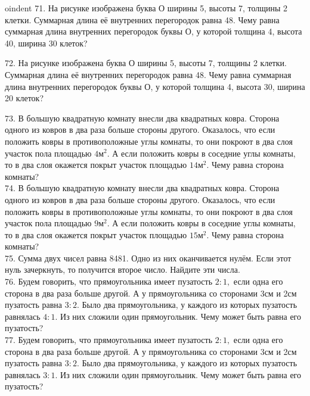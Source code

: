 oindent
71. На рисунке изображена буква О ширины 5, высоты 7, толщины 2 клетки. Суммарная длина её внутренних перегородок равна 48. Чему равна суммарная длина внутренних перегородок буквы О, у которой толщина 4, высота 40, ширина 30 клеток?
\begin{center}
\begin{figure}[ht!]
\end{figure}
\end{center}
72. На рисунке изображена буква О ширины 5, высоты 7, толщины 2 клетки. Суммарная длина её внутренних перегородок равна 48. Чему равна суммарная длина внутренних перегородок буквы О, у которой толщина 4, высота 30, ширина 20 клеток?
\begin{center}
\begin{figure}[ht!]
\end{figure}
\end{center}
73. В большую квадратную комнату внесли два квадратных ковра. Сторона одного из ковров в два раза больше стороны другого. Оказалось, что если положить ковры в противоположные углы комнаты, то они покроют в два слоя участок пола площадью $4\text{м}^2.$ А если положить ковры в соседние углы комнаты, то в два слоя окажется покрыт участок площадью $14\text{м}^2.$ Чему равна сторона комнаты?\\
74. В большую квадратную комнату внесли два квадратных ковра. Сторона одного из ковров в два раза больше стороны другого. Оказалось, что если положить ковры в противоположные углы комнаты, то они покроют в два слоя участок пола площадью $9\text{м}^2.$ А если положить ковры в соседние углы комнаты, то в два слоя окажется покрыт участок площадью $15\text{м}^2.$ Чему равна сторона комнаты?\\
75. Сумма двух чисел равна 8481. Одно из них оканчивается нулём. Если этот нуль зачеркнуть, то получится второе число. Найдите эти числа.\\
76. Будем говорить, что прямоугольника имеет пузатость $2:1,$ если одна его сторона в два раза больше другой. А у прямоугольника со сторонами 3см и 2см пузатость равна $3:2.$ Было два прямоугольника, у каждого из которых пузатость равнялась $4:1.$ Из них сложили один прямоугольник. Чему может быть равна его пузатость?\\
77. Будем говорить, что прямоугольника имеет пузатость $2:1,$ если одна его сторона в два раза больше другой. А у прямоугольника со сторонами 3см и 2см пузатость равна $3:2.$ Было два прямоугольника, у каждого из которых пузатость равнялась $3:1.$ Из них сложили один прямоугольник. Чему может быть равна его пузатость?\\
